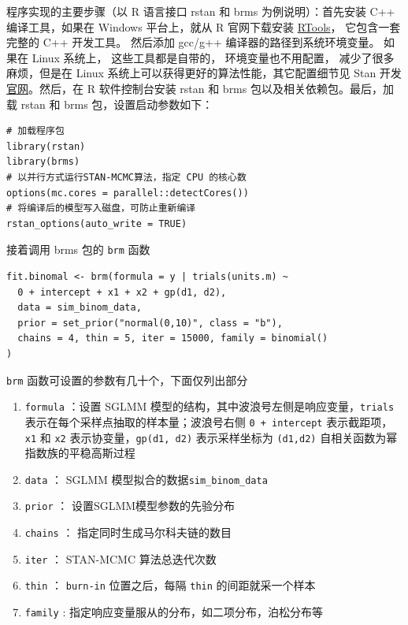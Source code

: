 \documentclass[12pt,a4paper,UTF8,twoside]{book}
\providecommand{\tightlist}{%
  \setlength{\itemsep}{0pt}\setlength{\parskip}{0pt}}
\theoremstyle{definition}
\theoremstyle{definition}
\theoremstyle{definition}
\theoremstyle{remark}
\begin{document}
程序实现的主要步骤（以 R 语言接口 rstan 和 brms 为例说明）：首先安装 C++
编译工具，如果在 Windows 平台上，就从 R 官网下载安装
\href{https://cran.r-project.org/bin/windows/Rtools/}{RTools}，
它包含一套完整的 C++ 开发工具。 然后添加 gcc/g++
编译器的路径到系统环境变量。 如果在 Linux 系统上， 这些工具都是自带的，
环境变量也不用配置， 减少了很多麻烦，但是在 Linux
系统上可以获得更好的算法性能，其它配置细节见 Stan
开发\href{https://github.com/stan-dev/rstan/wiki}{官网}。然后，在 R
软件控制台安装 rstan 和 brms 包以及相关依赖包。最后，加载 rstan 和 brms
包，设置启动参数如下：

\begin{verbatim}
# 加载程序包
library(rstan)
library(brms)
# 以并行方式运行STAN-MCMC算法，指定 CPU 的核心数
options(mc.cores = parallel::detectCores())
# 将编译后的模型写入磁盘，可防止重新编译
rstan_options(auto_write = TRUE)
\end{verbatim}

\noindent 接着调用 brms 包的 \texttt{brm} 函数

\begin{verbatim}
fit.binomal <- brm(formula = y | trials(units.m) ~ 
  0 + intercept + x1 + x2 + gp(d1, d2), 
  data = sim_binom_data,
  prior = set_prior("normal(0,10)", class = "b"),
  chains = 4, thin = 5, iter = 15000, family = binomial()
)    
\end{verbatim}

\texttt{brm} 函数可设置的参数有几十个，下面仅列出部分

\begin{enumerate}
\def\labelenumi{\arabic{enumi}.}
\tightlist
\item
  \texttt{formula} ：设置 SGLMM
  模型的结构，其中波浪号左侧是响应变量，\texttt{trials}
  表示在每个采样点抽取的样本量；波浪号右侧 \texttt{0\ +\ intercept}
  表示截距项， \texttt{x1} 和 \texttt{x2}
  表示协变量，\texttt{gp(d1,\ d2)} 表示采样坐标为 \texttt{(d1,d2)}
  自相关函数为幂指数族的平稳高斯过程
\item
  \texttt{data} ： SGLMM 模型拟合的数据\texttt{sim\_binom\_data}
\item
  \texttt{prior} ： 设置SGLMM模型参数的先验分布
\item
  \texttt{chains} ： 指定同时生成马尔科夫链的数目
\item
  \texttt{iter} ： STAN-MCMC 算法总迭代次数
\item
  \texttt{thin} ： \texttt{burn-in} 位置之后，每隔 \texttt{thin}
  的间距就采一个样本
\item
  \texttt{family} : 指定响应变量服从的分布，如二项分布，泊松分布等
\end{enumerate}
\end{document}
